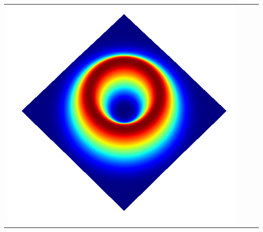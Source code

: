 \documentclass[a4paper, 12pt]{article}
\begin{document}
\begin{center}
\begin{tabular}{M{1cm}M{5cm}M{5cm}M{5cm}}
\includegraphics[width=\linewidth]{../resources/intensity_M=2.png} \\
\end{tabular}
\end{center}
\end{document}
